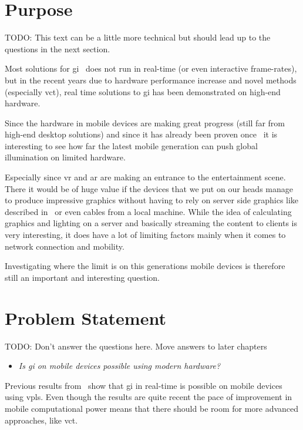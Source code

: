 \section{Purpose}

TODO: This text can be a little more technical but should lead up to the questions in the next section.

Most solutions for \gls{gi}~\cite{sotagi} does not run in real-time (or even interactive frame-rates), but in the recent years due to hardware performance increase and novel methods (especially \gls{vct}), real time solutions to \gls{gi} has been demonstrated on high-end hardware. 

Since the hardware in mobile devices are making great progress (still far from high-end desktop solutions) and since it has already been proven once~\cite{gimobile} it is interesting to see how far the latest mobile generation can push global illumination on limited hardware.

Especially since \gls{vr} and \gls{ar} are making an entrance to the entertainment scene.
There it would be of huge value if the devices that we put on our heads manage to produce impressive graphics without having to rely on server side graphics like described in~\cite{cloudlight} or even cables from a local machine. 
While the idea of calculating graphics and lighting on a server and basically streaming the content to clients is very interesting, it does have a lot of limiting factors mainly when it comes to network connection and mobility.

Investigating where the limit is on this generations mobile devices is therefore still an important and interesting question.

\section{Problem Statement}

TODO: Don't answer the questions here. Move answers to later chapters

\begin{itemize}
  \item \textit{Is \acrlong{gi} on mobile devices possible using modern hardware?}
\end{itemize}

Previous results from~\cite{gimobile} show that \gls{gi} in real-time is possible on mobile devices using \glspl{vpl}. 
Even though the results are quite recent the pace of improvement in mobile computational power means that there should be room for more advanced approaches, like \gls{vct}.


